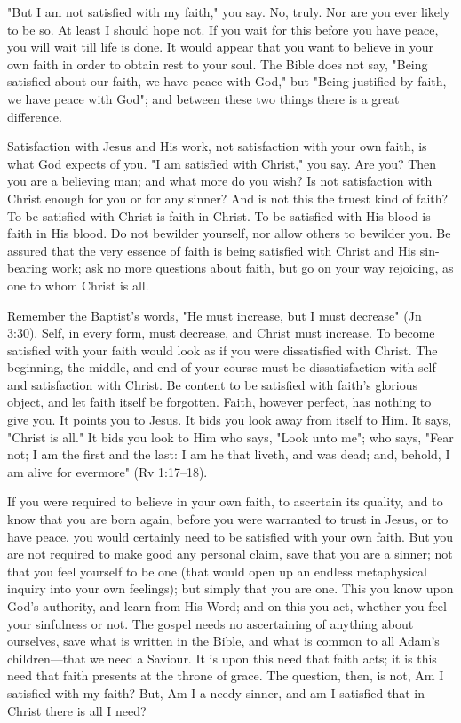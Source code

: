 \documentclass[
]{book}
\begin{document}
"But I am not satisfied with my faith," you say. No, truly. Nor are you ever likely to be so. At least I should hope not. If you wait for this before you have peace, you will wait till life is done. It would appear that you want to believe in your own faith in order to obtain rest to your soul. The Bible does not say, "Being satisfied about our faith, we have peace with God," but "Being justified by faith, we have peace with God"; and between these two things there is a great difference.

Satisfaction with Jesus and His work, not satisfaction with your own faith, is what God expects of you. "I am satisfied with Christ," you say. Are you? Then you are a believing man; and what more do you wish? Is not satisfaction with Christ enough for you or for any sinner? And is not this the truest kind of faith? To be satisfied with Christ is faith in Christ. To be satisfied with His blood is faith in His blood. Do not bewilder yourself, nor allow others to bewilder you. Be assured that the very essence of faith is being satisfied with Christ and His sin-bearing work; ask no more questions about faith, but go on your way rejoicing, as one to whom Christ is all.

Remember the Baptist's words, "He must increase, but I must decrease" (Jn 3:30). Self, in every form, must decrease, and Christ must increase. To become satisfied with your faith would look as if you were dissatisfied with Christ. The beginning, the middle, and end of your course must be dissatisfaction with self and satisfaction with Christ. Be content to be satisfied with faith's glorious object, and let faith itself be forgotten. Faith, however perfect, has nothing to give you. It points you to Jesus. It bids you look away from itself to Him. It says, "Christ is all." It bids you look to Him who says, "Look unto me"; who says, "Fear not; I am the first and the last: I am he that liveth, and was dead; and, behold, I am alive for evermore" (Rv 1:17--18).

If you were required to believe in your own faith, to ascertain its quality, and to know that you are born again, before you were warranted to trust in Jesus, or to have peace, you would certainly need to be satisfied with your own faith. But you are not required to make good any personal claim, save that you are a sinner; not that you feel yourself to be one (that would open up an endless metaphysical inquiry into your own feelings); but simply that you are one. This you know upon God's authority, and learn from His Word; and on this you act, whether you feel your sinfulness or not. The gospel needs no ascertaining of anything about ourselves, save what is written in the Bible, and what is common to all Adam's children---that we need a Saviour. It is upon this need that faith acts; it is this need that faith presents at the throne of grace. The question, then, is not, Am I satisfied with my faith? But, Am I a needy sinner, and am I satisfied that in Christ there is all I need?
\end{document}
